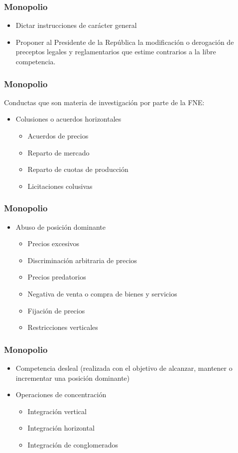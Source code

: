 \documentclass[dvipsnames,table,leqno]{beamer}
\begin{document}
		\begin{frame}
			\frametitle{Monopolio}
			\begin{itemize}
				\item Dictar instrucciones de carácter general
				\item Proponer al Presidente de la República la modificación o derogación de preceptos legales y reglamentarios que estime contrarios a la libre competencia.
			\end{itemize}
		\end{frame}	

		\begin{frame}
			\frametitle{Monopolio}
			Conductas que son materia de investigación por parte de la FNE:
			\begin{itemize}
				\item Colusiones o acuerdos horizontales
				\begin{itemize}
					\item Acuerdos de precios
					\item Reparto de mercado
					\item Reparto de cuotas de producción
					\item Licitaciones colusivas
				\end{itemize}
			\end{itemize}
		\end{frame}	

		\begin{frame}
			\frametitle{Monopolio}
			\begin{itemize}
				\item Abuso de posición dominante
				\begin{itemize}
					\item Precios excesivos
					\item Discriminación arbitraria de precios
					\item Precios predatorios
					\item Negativa de venta o compra de bienes y servicios
					\item Fijación de precios
					\item Restricciones verticales
				\end{itemize}
			\end{itemize}
		\end{frame}

		\begin{frame}
			\frametitle{Monopolio}
			\begin{itemize}
				\item Competencia desleal (realizada con el objetivo de alcanzar, mantener o incrementar una posición dominante)
				\item Operaciones de concentración
				\begin{itemize}
					\item Integración vertical
					\item Integración horizontal
					\item Integración de conglomerados
				\end{itemize}
			\end{itemize}
		\end{frame}
\end{document}
